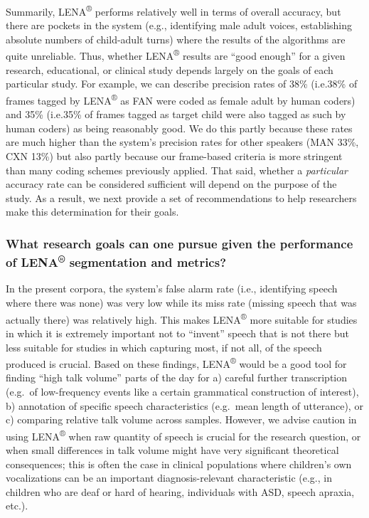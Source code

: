 \documentclass[english,table,man,floatsintext]{apa6}
\begin{document}
Summarily, LENA\textsuperscript{®} performs relatively well in terms of overall accuracy, but there are pockets in the system (e.g., identifying male adult voices, establishing absolute numbers of child-adult turns) where the results of the algorithms are quite unreliable. Thus, whether LENA\textsuperscript{®} results are \enquote{good enough} for a given research, educational, or clinical study depends largely on the goals of each particular study. For example, we can describe precision rates of 38\% (i.e.38\% of frames tagged by LENA\textsuperscript{®} as FAN were coded as female adult by human coders) and 35\% (i.e.35\% of frames tagged as target child were also tagged as such by human coders) as being reasonably good. We do this partly because these rates are much higher than the system's precision rates for other speakers (MAN 33\%, CXN 13\%) but also partly because our frame-based criteria is more stringent than many coding schemes previously applied. That said, whether a \emph{particular} accuracy rate can be considered sufficient will depend on the purpose of the study. As a result, we next provide a set of recommendations to help researchers make this determination for their goals.

\hypertarget{what-research-goals-can-one-pursue-given-the-performance-of-lena-segmentation-and-metrics}{%
\subsubsection{\texorpdfstring{What research goals can one pursue given the performance of LENA\textsuperscript{®} segmentation and metrics?}{What research goals can one pursue given the performance of LENA® segmentation and metrics?}}\label{what-research-goals-can-one-pursue-given-the-performance-of-lena-segmentation-and-metrics}}

In the present corpora, the system's false alarm rate (i.e., identifying speech where there was none) was very low while its miss rate (missing speech that was actually there) was relatively high. This makes LENA\textsuperscript{®} more suitable for studies in which it is extremely important not to \enquote{invent} speech that is not there but less suitable for studies in which capturing most, if not all, of the speech produced is crucial. Based on these findings, LENA\textsuperscript{®} would be a good tool for finding \enquote{high talk volume} parts of the day for a) careful further transcription (e.g.~of low-frequency events like a certain grammatical construction of interest), b) annotation of specific speech characteristics (e.g.~mean length of utterance), or c) comparing relative talk volume across samples. However, we advise caution in using LENA\textsuperscript{®} when raw quantity of speech is crucial for the research question, or when small differences in talk volume might have very significant theoretical consequences; this is often the case in clinical populations where children's own vocalizations can be an important diagnosis-relevant characteristic (e.g., in children who are deaf or hard of hearing, individuals with ASD, speech apraxia, etc.).
\end{document}
